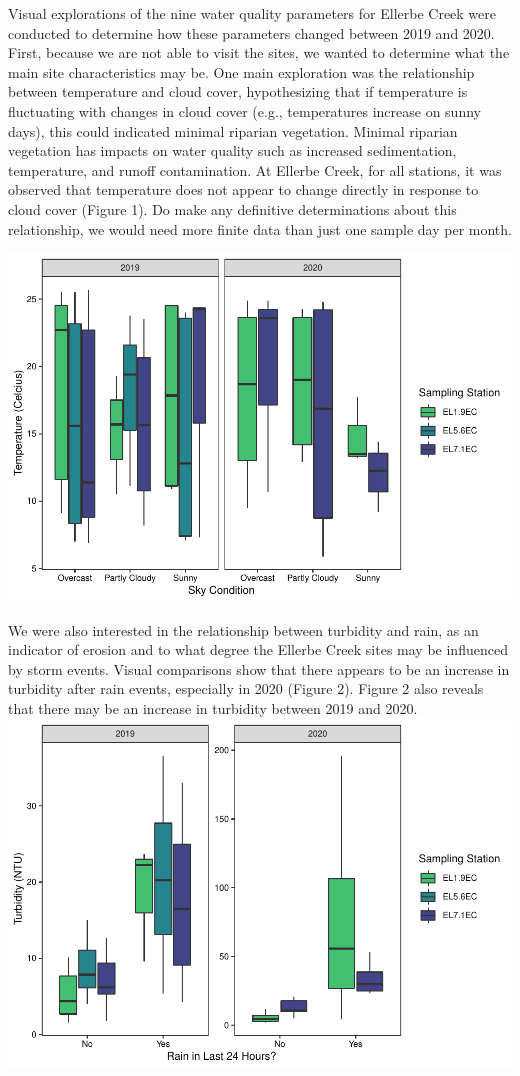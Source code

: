 \documentclass[
  12pt,
]{article}
\begin{document}
Visual explorations of the nine water quality parameters for Ellerbe
Creek were conducted to determine how these parameters changed between
2019 and 2020. First, because we are not able to visit the sites, we
wanted to determine what the main site characteristics may be. One main
exploration was the relationship between temperature and cloud cover,
hypothesizing that if temperature is fluctuating with changes in cloud
cover (e.g., temperatures increase on sunny days), this could indicated
minimal riparian vegetation. Minimal riparian vegetation has impacts on
water quality such as increased sedimentation, temperature, and runoff
contamination. At Ellerbe Creek, for all stations, it was observed that
temperature does not appear to change directly in response to cloud
cover (Figure 1). Do make any definitive determinations about this
relationship, we would need more finite data than just one sample day
per month.

\includegraphics{August_Lindborg_ENV872_Project_files/figure-latex/unnamed-chunk-4-1.pdf}

We were also interested in the relationship between turbidity and rain,
as an indicator of erosion and to what degree the Ellerbe Creek sites
may be influenced by storm events. Visual comparisons show that there
appears to be an increase in turbidity after rain events, especially in
2020 (Figure 2). Figure 2 also reveals that there may be an increase in
turbidity between 2019 and 2020.
\includegraphics{August_Lindborg_ENV872_Project_files/figure-latex/unnamed-chunk-5-1.pdf}
\end{document}
